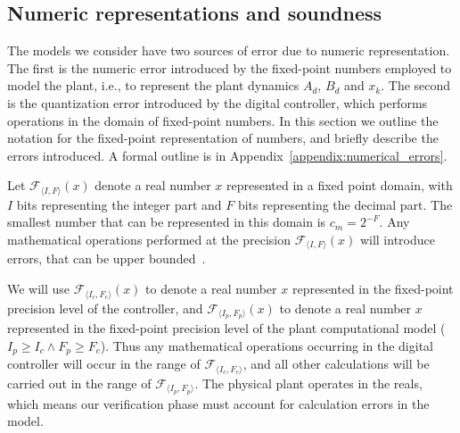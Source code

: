 \documentclass[runningheads,a4paper]{llncs}
\newcommand{\addtodo}[1]{{\color{red} TODO: #1}}
\begin{document}

\subsection{Numeric representations and soundness} 
\label{sec:numeric_rep}


The models we consider have two sources of error due to numeric representation. 
The first is the numeric error introduced by the fixed-point numbers employed to model the plant, i.e., to represent the plant dynamics $A_d$, $B_d$ and $x_k$. 
The second is the quantization error introduced by the digital controller, 
which performs operations in the domain of fixed-point numbers. 
In this section we outline the notation for the fixed-point representation of numbers, and briefly describe the errors introduced. A formal outline is in Appendix~\ref{appendix:numerical_errors}.

Let $\mathcal{F}_{\langle I,F \rangle}(x)$ denote a real number $x$ represented in a fixed point domain, with $I$ bits representing the integer part and $F$ bits representing the decimal part. The smallest number that can be represented in this domain is $c_m=2^{-F}$. Any mathematical operations performed at the precision $\mathcal{F}_{\langle I,F \rangle}(x)$ will introduce errors, that can be upper bounded~\cite{DBLP:conf/arith/BrainTRW15}. 

We will use $\mathcal{F}_{\langle I_c,F_c \rangle}(x)$ to denote a real number $x$ represented in the fixed-point precision level of the controller, and $\mathcal{F}_{\langle I_p,F_p \rangle}(x)$ to denote a real number $x$ represented in the fixed-point precision level of the plant computational model ($I_p \geq I_c \wedge F_p \geq F_c$).
Thus any mathematical operations occurring in the digital controller will occur in the range of $\mathcal{F}_{\langle I_c,F_c \rangle}$, and all other calculations will be carried out in the range of $\mathcal{F}_{\langle I_p,F_p \rangle}$. The physical plant operates in the reals, which means our verification phase must account for calculation errors in the model.
\end{document}
